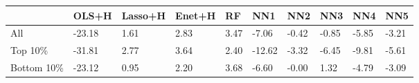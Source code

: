 \begin{tabularx}{\linewidth}{*{9}{X}}
& OLS+H& Lasso+H& Enet+H& RF& NN1& NN2& NN3& NN4& NN5\\
\hline
All& -23.18& 1.61& 2.83& 3.47& -7.06& -0.42& -0.85& -5.85& -3.21\\
\hline
Top 10\%& -31.81& 2.77& 3.64& 2.40& -12.62& -3.32& -6.45& -9.81& -5.61\\
\hline
Bottom 10\%& -23.12& 0.95& 2.20& 3.68& -6.60& -0.00& 1.32& -4.79& -3.09\\
\hline
\end{tabularx}